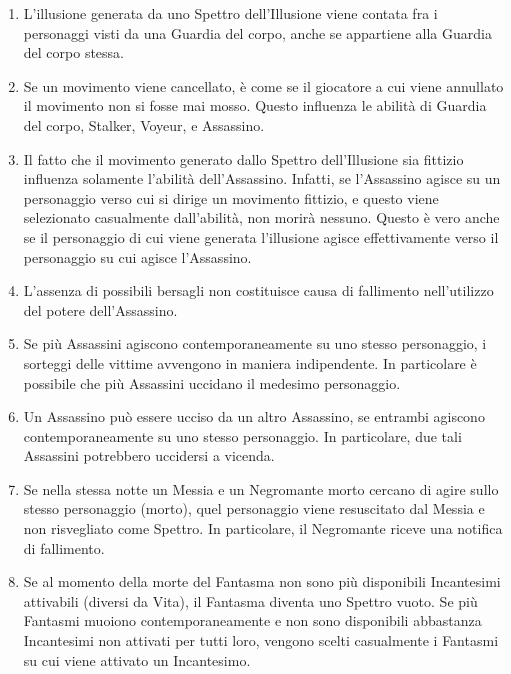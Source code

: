 \documentclass[a4paper,10pt]{article}
\begin{document}
\begin{enumerate}
	\item L'illusione generata da uno Spettro dell'Illusione viene contata fra i personaggi visti da una Guardia del corpo, anche se appartiene alla Guardia del corpo stessa.

	\item Se un movimento viene cancellato, è come se il giocatore a cui viene annullato il movimento non si fosse mai mosso. Questo influenza le abilità di Guardia del corpo, Stalker, Voyeur, e Assassino.
	
	\item Il fatto che il movimento generato dallo Spettro dell'Illusione sia fittizio influenza solamente l'abilità dell'Assassino. Infatti, se l'Assassino agisce su un personaggio verso cui si dirige un movimento fittizio, e questo viene selezionato casualmente dall'abilità, non morirà nessuno. Questo è vero anche se il personaggio di cui viene generata l'illusione agisce effettivamente verso il personaggio su cui agisce l'Assassino.
	
	\item L'assenza di possibili bersagli non costituisce causa di fallimento nell'utilizzo del potere dell'Assassino.
	
	\item Se più Assassini agiscono contemporaneamente su uno stesso personaggio, i sorteggi delle vittime avvengono in maniera indipendente.
	In particolare è possibile che più Assassini uccidano il medesimo personaggio.
	
	\item Un Assassino può essere ucciso da un altro Assassino, se entrambi agiscono contemporaneamente su uno stesso personaggio. In particolare, due tali Assassini potrebbero uccidersi a vicenda.
	
	\item Se nella stessa notte un Messia e un Negromante morto cercano di agire sullo stesso personaggio (morto), quel personaggio viene resuscitato dal Messia e non risvegliato come Spettro. In particolare, il Negromante riceve una notifica di fallimento.
	
	\item Se al momento della morte del Fantasma non sono più disponibili Incantesimi attivabili (diversi da Vita), il Fantasma diventa uno Spettro vuoto. Se più Fantasmi muoiono contemporaneamente e non sono disponibili abbastanza Incantesimi non attivati per tutti loro, vengono scelti casualmente i Fantasmi su cui viene attivato un Incantesimo.
	

\end{enumerate}
\end{document}

